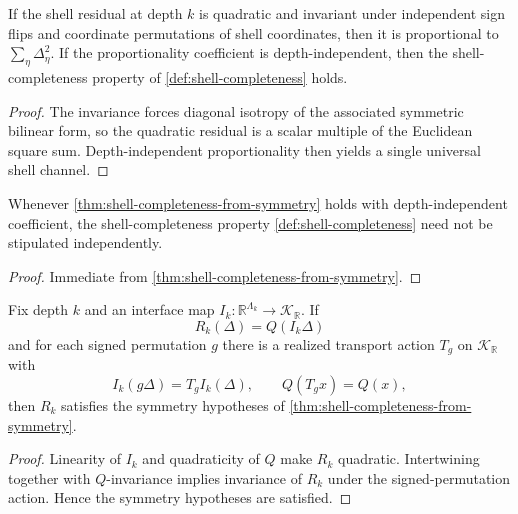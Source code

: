 \begin{theorem}
\label{thm:shell-completeness-from-symmetry}
If the shell residual at depth \(k\) is quadratic and invariant under
independent sign flips and coordinate permutations of shell coordinates,
then it is proportional to
\(\sum_\eta\Delta_\eta^2\).
If the proportionality coefficient is depth-independent, then
the shell-completeness property of \cref{def:shell-completeness} holds.
\end{theorem}

\begin{proof}
The invariance forces diagonal isotropy of the associated symmetric bilinear
form, so the quadratic residual is a scalar multiple of the Euclidean square
sum.
Depth-independent proportionality then yields a single universal shell
channel.
\end{proof}

\begin{corollary}
\label{cor:shell-completeness-discharged}
Whenever \cref{thm:shell-completeness-from-symmetry} holds with
depth-independent coefficient, the shell-completeness property
\cref{def:shell-completeness} need not be stipulated independently.
\end{corollary}

\begin{proof}
Immediate from \cref{thm:shell-completeness-from-symmetry}.
\end{proof}

\begin{theorem}
\label{thm:shell-symmetry-from-transport}
Fix depth \(k\) and an interface map
\(I_k:\mathbb R^{\Lambda_k}\to\mathcal K_{\mathbb R}\).
If
\[
  R_k(\Delta)=Q(I_k\Delta)
\]
and for each signed permutation \(g\) there is a realized transport action
\(T_g\) on \(\mathcal K_{\mathbb R}\) with
\[
  I_k(g\Delta)=T_gI_k(\Delta),
  \qquad
  Q(T_gx)=Q(x),
\]
then \(R_k\) satisfies the symmetry hypotheses of
\cref{thm:shell-completeness-from-symmetry}.
\end{theorem}

\begin{proof}
Linearity of \(I_k\) and quadraticity of \(Q\) make \(R_k\) quadratic.
Intertwining together with \(Q\)-invariance implies invariance of
\(R_k\) under the signed-permutation action.
Hence the symmetry hypotheses are satisfied.
\end{proof}

